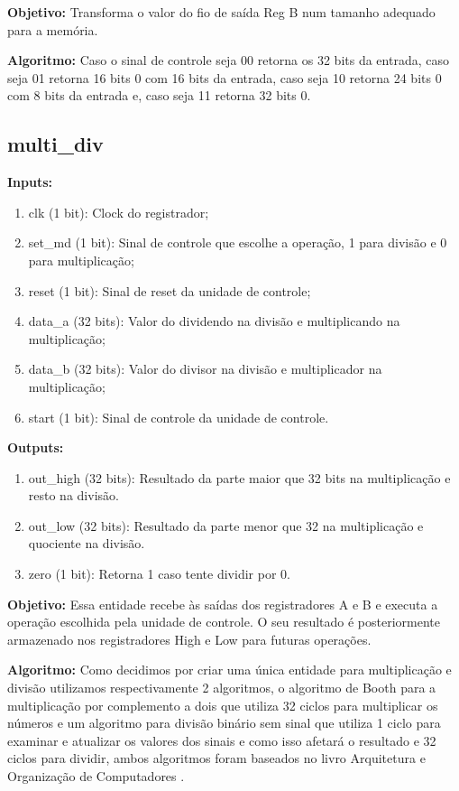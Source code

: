 \textbf{Objetivo:} Transforma o valor do fio de saída Reg B num tamanho adequado para a memória.

\textbf{Algoritmo:} Caso o sinal de controle seja 00 retorna os 32 bits da entrada, caso seja 01 retorna 16 bits 0 com 16 bits da entrada, caso seja 10 retorna 24 bits 0 com 8 bits da entrada e, caso seja 11 retorna 32 bits 0.

\newpage

\subsection{multi\_div}

\textbf{Inputs:}

\begin{enumerate}
    \item clk (1 bit): Clock do registrador;
    \item set\_md (1 bit): Sinal de controle que escolhe a operação, 1 para divisão e 0 para multiplicação;
    \item reset (1 bit): Sinal de reset da unidade de controle;
    \item data\_a (32 bits): Valor do dividendo na divisão e multiplicando na multiplicação;
    \item data\_b (32 bits): Valor do divisor na divisão e multiplicador na multiplicação;
    \item start (1 bit): Sinal de controle da unidade de controle.
\end{enumerate}

\textbf{Outputs:}

\begin{enumerate}
    \item out\_high (32 bits): Resultado da parte maior que 32 bits na multiplicação e resto na divisão.
    \item out\_low (32 bits): Resultado da parte menor que 32 na multiplicação e quociente na divisão.
    \item zero (1 bit): Retorna 1 caso tente dividir por 0.
\end{enumerate}

\textbf{Objetivo:} Essa entidade recebe às saídas dos registradores A e B e executa a operação escolhida pela unidade de controle. O seu resultado é posteriormente armazenado nos registradores High e Low para futuras operações.

\textbf{Algoritmo:} Como decidimos por criar uma única entidade para multiplicação e divisão utilizamos respectivamente 2 algoritmos, o algoritmo de Booth para a multiplicação por complemento a dois que utiliza 32 ciclos para multiplicar os números e um algoritmo para divisão binário sem sinal que utiliza 1 ciclo para examinar e atualizar os valores dos sinais e como isso afetará o resultado e 32 ciclos para dividir, ambos algoritmos foram baseados no livro Arquitetura e Organização de Computadores \cite{arquiteturaDeComputadores}. \\

